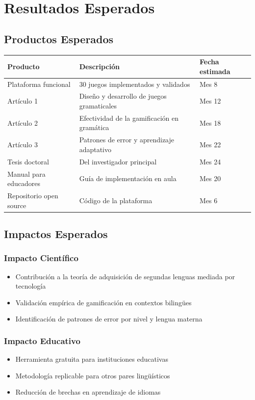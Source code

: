 \documentclass[12pt,a4paper]{article}
\begin{document}
\section{Resultados Esperados}

\subsection{Productos Esperados}

\begin{table}[H]
\centering
\begin{tabular}{|l|l|l|}
\hline
\textbf{Producto} & \textbf{Descripción} & \textbf{Fecha estimada} \\
\hline
Plataforma funcional & 30 juegos implementados y validados & Mes 8 \\
Artículo 1 & Diseño y desarrollo de juegos gramaticales & Mes 12 \\
Artículo 2 & Efectividad de la gamificación en gramática & Mes 18 \\
Artículo 3 & Patrones de error y aprendizaje adaptativo & Mes 22 \\
Tesis doctoral & Del investigador principal & Mes 24 \\
Manual para educadores & Guía de implementación en aula & Mes 20 \\
Repositorio open source & Código de la plataforma & Mes 6 \\
\hline
\end{tabular}
\end{table}

\subsection{Impactos Esperados}

\subsubsection{Impacto Científico}
\begin{itemize}
    \item Contribución a la teoría de adquisición de segundas lenguas mediada por tecnología
    \item Validación empírica de gamificación en contextos bilingües
    \item Identificación de patrones de error por nivel y lengua materna
\end{itemize}

\subsubsection{Impacto Educativo}
\begin{itemize}
    \item Herramienta gratuita para instituciones educativas
    \item Metodología replicable para otros pares lingüísticos
    \item Reducción de brechas en aprendizaje de idiomas
\end{itemize}
\end{document}
